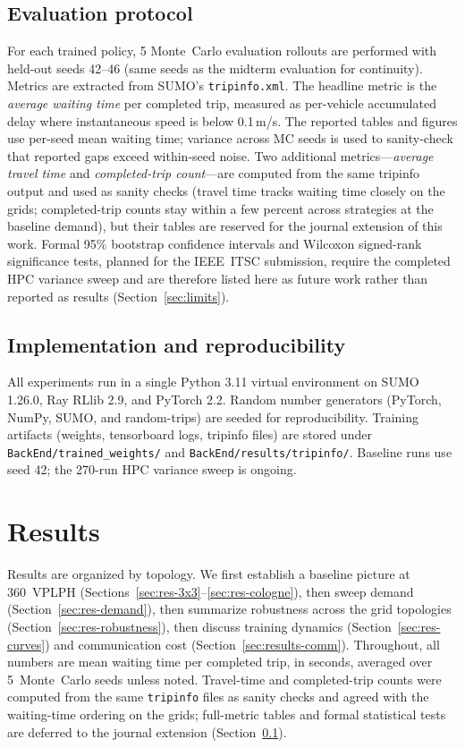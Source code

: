 \documentclass[conference]{IEEEtran}
\begin{document}
\subsection{Evaluation protocol}\label{sec:setup-eval}
For each trained policy, 5 Monte~Carlo evaluation rollouts are performed with held-out seeds 42--46 (same seeds as the midterm evaluation for continuity). Metrics are extracted from SUMO's \texttt{tripinfo.xml}. The headline metric is the \emph{average waiting time} per completed trip, measured as per-vehicle accumulated delay where instantaneous speed is below 0.1\,m/s. The reported tables and figures use per-seed mean waiting time; variance across MC seeds is used to sanity-check that reported gaps exceed within-seed noise. Two additional metrics---\emph{average travel time} and \emph{completed-trip count}---are computed from the same tripinfo output and used as sanity checks (travel time tracks waiting time closely on the grids; completed-trip counts stay within a few percent across strategies at the baseline demand), but their tables are reserved for the journal extension of this work. Formal 95\% bootstrap confidence intervals and Wilcoxon signed-rank significance tests, planned for the IEEE~ITSC submission, require the completed HPC variance sweep and are therefore listed here as future work rather than reported as results (Section~\ref{sec:limits}).

\subsection{Implementation and reproducibility}
All experiments run in a single Python 3.11 virtual environment on SUMO 1.26.0, Ray RLlib 2.9, and PyTorch 2.2. Random number generators (PyTorch, NumPy, SUMO, and random-trips) are seeded for reproducibility. Training artifacts (weights, tensorboard logs, tripinfo files) are stored under \texttt{BackEnd/trained\_weights/} and \texttt{BackEnd/results/tripinfo/}. Baseline runs use seed 42; the 270-run HPC variance sweep is ongoing.

\section{Results}\label{sec:results}

Results are organized by topology. We first establish a baseline picture at 360~VPLPH (Sections~\ref{sec:res-3x3}--\ref{sec:res-cologne}), then sweep demand (Section~\ref{sec:res-demand}), then summarize robustness across the grid topologies (Section~\ref{sec:res-robustness}), then discuss training dynamics (Section~\ref{sec:res-curves}) and communication cost (Section~\ref{sec:results-comm}). Throughout, all numbers are mean waiting time per completed trip, in seconds, averaged over 5~Monte~Carlo seeds unless noted. Travel-time and completed-trip counts were computed from the same \texttt{tripinfo} files as sanity checks and agreed with the waiting-time ordering on the grids; full-metric tables and formal statistical tests are deferred to the journal extension (Section~\ref{sec:setup-eval}).
\end{document}
